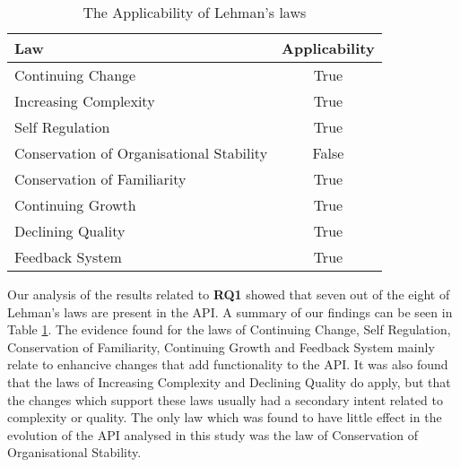 \documentclass{sig-alternate}
\begin{document}
\begin{table}
       \centering
       \begin{tabular}[ht]{l|c}
              \toprule

              \textbf{Law}                              & \textbf{Applicability}    \\ \midrule
              Continuing Change                         & True                      \\ \hline
              Increasing Complexity                     & True                     \\ \hline
              Self Regulation                           & True                      \\ \hline
              Conservation of Organisational Stability  & False                     \\ \hline
              Conservation of Familiarity               & True                      \\ \hline
              Continuing Growth                         & True                      \\ \hline
              Declining Quality                         & True                     \\ \hline
              Feedback System                           & True                      \\ 

              \bottomrule

       \end{tabular}
       \caption{The Applicability of Lehman's laws}
       \label{table:lehman}
\end{table}

\newpage

Our analysis of the results related to \textbf{RQ1} showed that seven out of the eight of Lehman's laws \cite{lehman90sview} are present in the API. 
A summary of our findings can be seen in Table \ref{table:lehman}. 
The evidence found for the laws of Continuing Change, Self Regulation, Conservation of Familiarity, Continuing Growth and Feedback System mainly relate to enhancive changes that add functionality to the API. 
It was also found that the laws of Increasing Complexity and Declining Quality do apply, but that the changes which support these laws usually had a secondary intent related to complexity or quality. The only law which was found to have little effect in the evolution of the API analysed in this study was the law of Conservation of Organisational Stability. 
\end{document}
